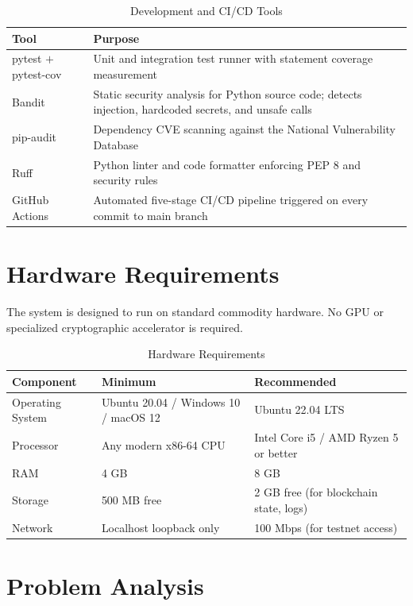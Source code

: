 \documentclass[12pt,a4paper]{report}
\begin{document}
\begin{table}[H]
\centering
\caption{Development and CI/CD Tools}
\label{tab:devtools}
\begin{tabular}{|l|p{9cm}|}
\hline
\textbf{Tool} & \textbf{Purpose} \\
\hline
pytest $+$ pytest-cov & Unit and integration test runner with statement coverage measurement \\
\hline
Bandit & Static security analysis for Python source code; detects injection, hardcoded secrets, and unsafe calls \\
\hline
pip-audit & Dependency CVE scanning against the National Vulnerability Database \\
\hline
Ruff & Python linter and code formatter enforcing PEP 8 and security rules \\
\hline
GitHub Actions & Automated five-stage CI/CD pipeline triggered on every commit to main branch \\
\hline
\end{tabular}
\end{table}

\section{Hardware Requirements}

The system is designed to run on standard commodity hardware. No GPU or specialized
cryptographic accelerator is required.

\begin{table}[H]
\centering
\caption{Hardware Requirements}
\label{tab:hardware}
\begin{tabular}{|l|l|l|}
\hline
\textbf{Component} & \textbf{Minimum} & \textbf{Recommended} \\
\hline
Operating System & Ubuntu 20.04 / Windows 10 / macOS 12 & Ubuntu 22.04 LTS \\
\hline
Processor & Any modern x86-64 CPU & Intel Core i5 / AMD Ryzen 5 or better \\
\hline
RAM & 4 GB & 8 GB \\
\hline
Storage & 500 MB free & 2 GB free (for blockchain state, logs) \\
\hline
Network & Localhost loopback only & 100 Mbps (for testnet access) \\
\hline
\end{tabular}
\end{table}

\section{Problem Analysis}
\end{document}
